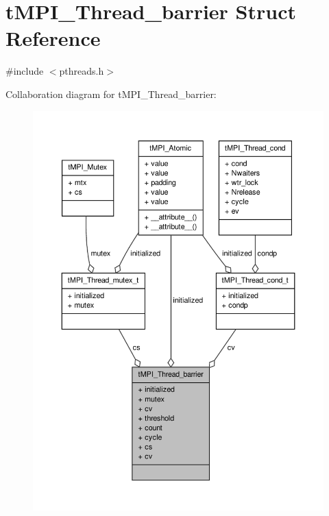 \hypertarget{structtMPI__Thread__barrier}{\section{t\-M\-P\-I\-\_\-\-Thread\-\_\-barrier \-Struct \-Reference}
\label{structtMPI__Thread__barrier}
}


{\ttfamily \#include $<$pthreads.\-h$>$}



\-Collaboration diagram for t\-M\-P\-I\-\_\-\-Thread\-\_\-barrier\-:
\nopagebreak
\begin{figure}[H]
\begin{center}
\leavevmode
\includegraphics[width=350pt]{structtMPI__Thread__barrier__coll__graph}
\end{center}
\end{figure}
